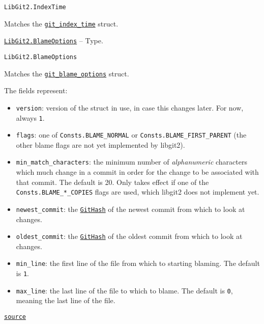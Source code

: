 \begin{adjustwidth}{2em}{0pt}


\begin{verbatim}
LibGit2.IndexTime
\end{verbatim}

Matches the \href{https://libgit2.org/libgit2/\#HEAD/type/git\_index\_time}{\texttt{git\_index\_time}} struct.



\end{adjustwidth}
\hypertarget{13109557230915215869}{} 
\hyperlink{13109557230915215869}{\texttt{LibGit2.BlameOptions}}  -- {Type.}

\begin{adjustwidth}{2em}{0pt}


\begin{verbatim}
LibGit2.BlameOptions
\end{verbatim}

Matches the \href{https://libgit2.org/libgit2/\#HEAD/type/git\_blame\_options}{\texttt{git\_blame\_options}} struct.

The fields represent:

\begin{itemize}
\item \texttt{version}: version of the struct in use, in case this changes later. For now, always \texttt{1}.


\item \texttt{flags}: one of \texttt{Consts.BLAME\_NORMAL} or \texttt{Consts.BLAME\_FIRST\_PARENT} (the other blame flags  are not yet implemented by libgit2).


\item \texttt{min\_match\_characters}: the minimum number of \emph{alphanumeric} characters which much change in a commit in order for the change to be associated with that commit. The default is 20. Only takes effect if one of the \texttt{Consts.BLAME\_*\_COPIES} flags are used, which libgit2 does not implement yet.


\item \texttt{newest\_commit}: the \hyperlink{202290709580230708}{\texttt{GitHash}} of the newest commit from which to look at changes.


\item \texttt{oldest\_commit}: the \hyperlink{202290709580230708}{\texttt{GitHash}} of the oldest commit from which to look at changes.


\item \texttt{min\_line}: the first line of the file from which to starting blaming. The default is \texttt{1}.


\item \texttt{max\_line}: the last line of the file to which to blame. The default is \texttt{0}, meaning the last line of the file.

\end{itemize}


\href{https://github.com/JuliaLang/julia/blob/44fa15b1502a45eac76c9017af94332d4557b251/base/#L0-L18}{\texttt{source}}


\end{adjustwidth}
